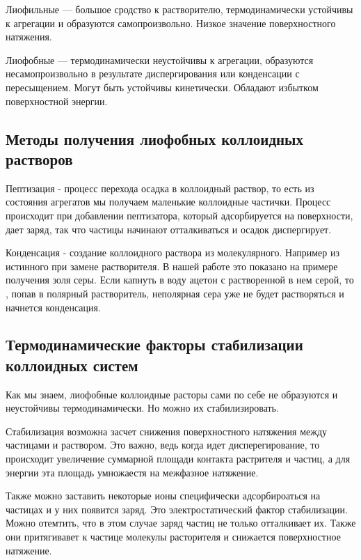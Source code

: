 \documentclass[a4paper,12pt]{article}
\begin{document}
Лиофильные —  большое сродство к растворителю, термодинамически устойчивы к агрегации и образуются самопроизвольно. Низкое значение поверхностного натяжения.

Лиофобные — термодинамически неустойчивы к агрегации, образуются несамопроизвольно в результате диспергирования или конденсации с пересыщением. Могут быть устойчивы кинетически. Обладают избытком поверхностной энергии.

\subsection{Методы получения лиофобных коллоидных растворов}

Пептизация - процесс перехода осадка в коллоидный раствор, то есть из состояния агрегатов мы получаем маленькие коллоидные частички. Процесс происходит при добавлении пептизатора, который адсорбируется на поверхности, дает заряд, так что частицы начинают отталкиваться и осадок диспергирует. 

Конденсация - создание коллоидного раствора из молекулярного. Например из истинного при замене растворителя. В нашей работе это показано на примере получения золя серы. Если капнуть в воду ацетон с растворенной в нем серой, то , попав в полярный растворитель, неполярная сера уже не будет растворяться и начнется конденсация.

\subsection{Термодинамические факторы стабилизации коллоидных систем}

Как мы знаем, лиофобные коллоидные расторы сами по себе не образуются и неустойчивы термодинамически. Но можно их стабилизировать. 

Стабилизация возможна засчет снижения поверхностного натяжения между частицами и раствором. Это важно, ведь когда идет дисперегирование, то происходит увеличение суммарной площади контакта растрителя и частиц, а для энергии эта площадь умножаестя на межфазное натяжение. 

Также можно заставить некоторые ионы специфически адсорбироаться на частицах и у них появится заряд. Это электростатический фактор стабилизации. Можно отемтить, что в этом случае заряд частиц не только отталкивает их. Также они притягивавет к частице молекулы расторителя и снижается поверхностное натяжение.
\end{document}
